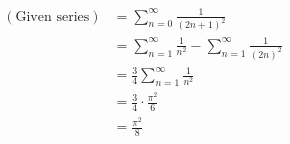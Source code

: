 \item

\begin{align*}
	(\text{Given series})
	 & = \sum_{n = 0}^\infty \frac{1}{{(2n + 1)}^2}                                 \\
	 & = \sum_{n = 1}^\infty \frac{1}{n^2} - \sum_{n = 1}^\infty \frac{1}{{(2n)}^2} \\
	 & = \frac{3}{4} \sum_{n = 1}^\infty \frac{1}{n^2}                              \\
	 & = \frac{3}{4} \cdot \frac{\pi^2}{6}                                          \\
	 & = \frac{\pi^2}{8}
\end{align*}
